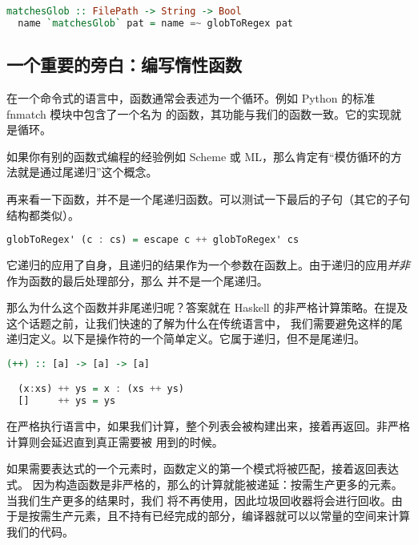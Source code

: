 \documentclass[./main.tex]{subfiles}
\begin{document}
\begin{lstlisting}[language=Haskell]
  matchesGlob :: FilePath -> String -> Bool
  name `matchesGlob` pat = name =~ globToRegex pat
\end{lstlisting}

\subsection*{一个重要的旁白：编写惰性函数}

在一个命令式的语言中，函数通常会表述为一个循环。例如 Python 的标准 fnmatch 模块中包含了一个名为
的函数，其功能与我们的函数一致。它的实现就是循环。

如果你有别的函数式编程的经验例如 Scheme 或 ML，那么肯定有“模仿循环的方法就是通过尾递归”这个概念。

再来看一下函数，并不是一个尾递归函数。可以测试一下最后的子句（其它的子句结构都类似）。

\begin{lstlisting}[language=Haskell]
  globToRegex' (c : cs) = escape c ++ globToRegex' cs
\end{lstlisting}

它递归的应用了自身，且递归的结果作为一个参数在\acode{(++)}函数上。由于递归的应用\textit{并非}作为函数的最后处理部分，那么
并不是一个尾递归。

那么为什么这个函数并非尾递归呢？答案就在 Haskell 的非严格计算策略。在提及这个话题之前，让我们快速的了解为什么在传统语言中，
我们需要避免这样的尾递归定义。以下是\acode{(++)}操作符的一个简单定义。它属于递归，但不是尾递归。

\begin{lstlisting}[language=Haskell]
  (++) :: [a] -> [a] -> [a]

  (x:xs) ++ ys = x : (xs ++ ys)
  []     ++ ys = ys
\end{lstlisting}

在严格执行语言中，如果我们计算，整个列表会被构建出来，接着再返回。非严格计算则会延迟直到真正需要被
用到的时候。

如果需要表达式的一个元素时，函数定义的第一个模式将被匹配，接着返回表达式。
因为\acode{(:)}构造函数是非严格的，那么的计算就能被递延：按需生产更多的元素。当我们生产更多的结果时，我们
将不再使用，因此垃圾回收器将会进行回收。由于是按需生产元素，且不持有已经完成的部分，编译器就可以以常量的空间来计算
我们的代码。
\end{document}
